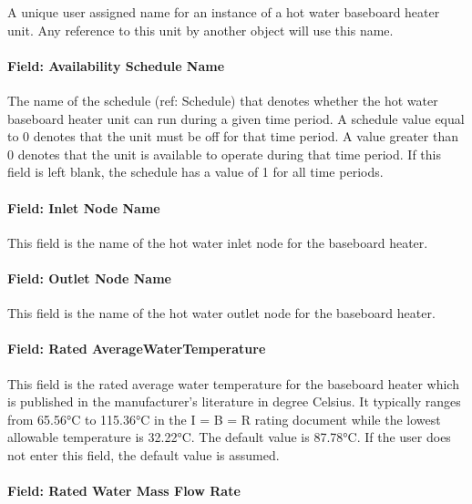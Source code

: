 A unique user assigned name for an instance of a hot water baseboard heater unit. Any reference to this unit by another object will use this name.

\paragraph{Field: Availability Schedule Name}\label{field-availability-schedule-name-013}

The name of the schedule (ref: Schedule) that denotes whether the hot water baseboard heater unit can run during a given time period. A schedule value equal to 0 denotes that the unit must be off for that time period. A value greater than 0 denotes that the unit is available to operate during that time period. If this field is left blank, the schedule has a value of 1 for all time periods.

\paragraph{Field: Inlet Node Name}\label{field-inlet-node-name-006}

This field is the name of the hot water inlet node for the baseboard heater.

\paragraph{Field: Outlet Node Name}\label{field-outlet-node-name-007}

This field is the name of the hot water outlet node for the baseboard heater.

\paragraph{Field: Rated AverageWaterTemperature}\label{field-rated-averagewatertemperature}

This field is the rated average water temperature for the baseboard heater which is published in the manufacturer's literature in degree Celsius. It typically ranges from 65.56°C to 115.36°C in the I = B = R rating document while the lowest allowable temperature is 32.22°C. The default value is 87.78°C. If the user does not enter this field, the default value is assumed.

\paragraph{Field: Rated Water Mass Flow Rate}\label{field-rated-water-mass-flow-rate}

